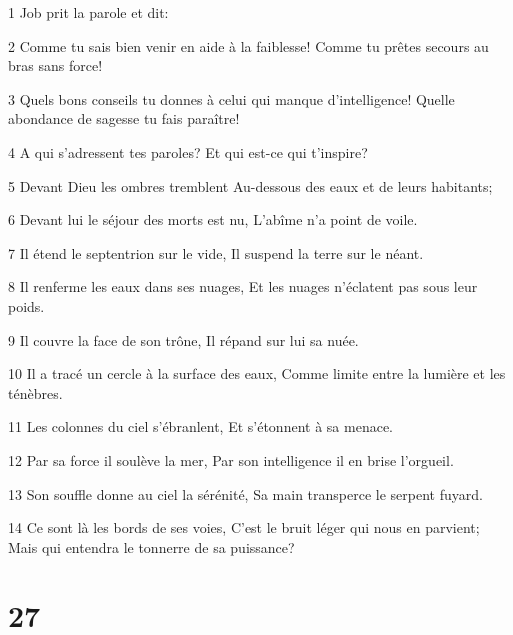 \par 1 Job prit la parole et dit:
\par 2 Comme tu sais bien venir en aide à la faiblesse! Comme tu prêtes secours au bras sans force!
\par 3 Quels bons conseils tu donnes à celui qui manque d'intelligence! Quelle abondance de sagesse tu fais paraître!
\par 4 A qui s'adressent tes paroles? Et qui est-ce qui t'inspire?
\par 5 Devant Dieu les ombres tremblent Au-dessous des eaux et de leurs habitants;
\par 6 Devant lui le séjour des morts est nu, L'abîme n'a point de voile.
\par 7 Il étend le septentrion sur le vide, Il suspend la terre sur le néant.
\par 8 Il renferme les eaux dans ses nuages, Et les nuages n'éclatent pas sous leur poids.
\par 9 Il couvre la face de son trône, Il répand sur lui sa nuée.
\par 10 Il a tracé un cercle à la surface des eaux, Comme limite entre la lumière et les ténèbres.
\par 11 Les colonnes du ciel s'ébranlent, Et s'étonnent à sa menace.
\par 12 Par sa force il soulève la mer, Par son intelligence il en brise l'orgueil.
\par 13 Son souffle donne au ciel la sérénité, Sa main transperce le serpent fuyard.
\par 14 Ce sont là les bords de ses voies, C'est le bruit léger qui nous en parvient; Mais qui entendra le tonnerre de sa puissance?

\chapter{27}

